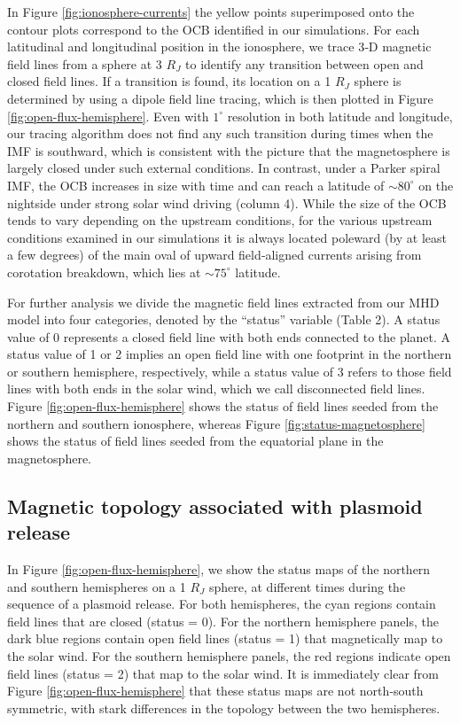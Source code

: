 In Figure \ref{fig:ionosphere-currents} the yellow points superimposed onto the contour plots correspond to the OCB identified in our simulations. For each latitudinal and longitudinal position in the ionosphere, we trace 3‐D magnetic field lines from a sphere at 3 $R_J$ to identify any transition between open and closed field lines. If a transition is found, its location on a 1 $R_J$ sphere is determined by using a dipole field line tracing, which is then plotted in Figure \ref{fig:open-flux-hemisphere}. Even with $1^\circ$ resolution in both latitude and longitude, our tracing algorithm does not find any such transition during times when the IMF is southward, which is consistent with the picture that the magnetosphere is largely closed under such external conditions. In contrast, under a Parker spiral IMF, the OCB increases in size with time and can reach a latitude of $\sim80^\circ$ on the nightside under strong solar wind driving (column 4). While the size of the OCB tends to vary depending on the upstream conditions, for the various upstream conditions examined in our simulations it is always located poleward (by at least a few degrees) of the main oval of upward field‐aligned currents arising from corotation breakdown, which lies at $\sim75^\circ$ latitude. 

For further analysis we divide the magnetic field lines extracted from our MHD model into four categories, denoted by the “status” variable (Table 2). A status value of 0 represents a closed field line with both ends connected to the planet. A status value of 1 or 2 implies an open field line with one footprint in the northern or southern hemisphere, respectively, while a status value of 3 refers to those field lines with both ends in the solar wind, which we call disconnected field lines. Figure \ref{fig:open-flux-hemisphere} shows the status of field lines seeded from the northern and southern ionosphere, whereas Figure \ref{fig:status-magnetosphere} shows the status of field lines seeded from the equatorial plane in the magnetosphere. 

\subsection{Magnetic topology associated with plasmoid release}

In Figure \ref{fig:open-flux-hemisphere}, we show the status maps of the northern and southern hemispheres on a 1 $R_J$ sphere, at different times during the sequence of a plasmoid release. For both hemispheres, the cyan regions contain field lines that are closed (status = 0). For the northern hemisphere panels, the dark blue regions contain open field lines (status = 1) that magnetically map to the solar wind. For the southern hemisphere panels, the red regions indicate open field lines (status = 2) that map to the solar wind. It is immediately clear from Figure \ref{fig:open-flux-hemisphere} that these status maps are not north‐south symmetric, with stark differences in the topology between the two hemispheres. 

